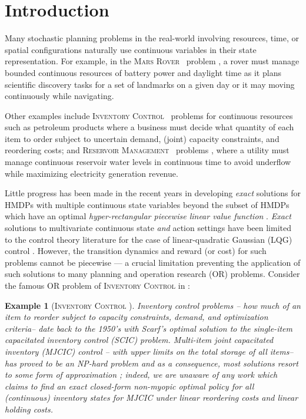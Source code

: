 \documentclass[twoside,11pt]{article}
\newcommand{\MarsRover}{\textsc{Mars Rover }}
\newcommand{\InventoryControl}{\textsc{Inventory Control }}
\newcommand{\WaterReservoir}{\textsc{Reservoir Management }}
\newtheorem*{example*}{Example}
\begin{document}
\section{Introduction}
\label{Introduction}
Many stochastic planning problems in the real-world involving resources, time, or spatial configurations naturally use continuous variables in their state representation.  For example, in the \MarsRover\  problem \cite{bresina02}, a rover must manage bounded continuous resources of battery power and daylight time as it plans scientific discovery tasks for a set of landmarks on a given day or it may moving continuously while navigating. 

Other examples include \InventoryControl\ problems \cite{Scarf_Karlin58} for continuous resources such as petroleum products where a business must decide what quantity of each item to order subject to uncertain demand, (joint) capacity constraints, and reordering costs; and  \WaterReservoir\ problems \cite{reservoir}, where a utility must manage continuous reservoir water levels in continuous time to avoid underflow while maximizing electricity generation revenue.

Little progress has been made in the recent years in developing \emph{exact} solutions for HMDPs with multiple continuous state variables beyond the subset of HMDPs  which have an optimal \emph{hyper-rectangular piecewise linear value function} \cite{feng04,li05}. \emph{Exact} solutions to multivariate continuous state \emph{and} action settings have been limited to the control theory literature for the case of linear-quadratic Gaussian (LQG) control \cite{lqgc}. 
However, the transition dynamics and reward (or cost) for such problems cannot be piecewise --- a crucial limitation preventing the application of such solutions to many planning and operation research (OR) problems. 
Consider the famous OR problem of \InventoryControl in \cite{Scarf_Karlin58}: 
\begin{example*} [\InventoryControl]
Inventory control problems -- how much of an
item to reorder subject to capacity constraints, demand, and optimization criteria-- date back to the 1950's with Scarf's optimal solution to the \emph{single-item capacitated inventory control} (SCIC) problem.
\emph{Multi-item joint capacitated inventory (MJCIC) control} -- with upper limits
on the total storage of all items-- has proved to be an NP-hard problem and
as a consequence, most solutions resort to some form of
approximation \cite{bitran,wusd10}; indeed, we are unaware of any 
work which claims to find an exact closed-form non-myopic
optimal policy for \emph{all} (continuous) inventory states for MJCIC 
under linear reordering costs and linear holding costs.
\end{example*}
\end{document}
